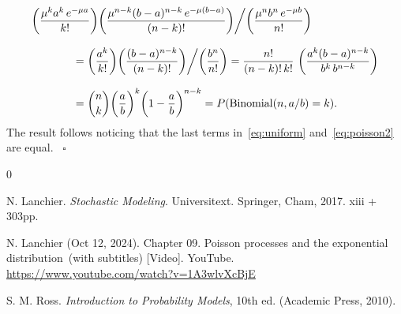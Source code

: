 \documentclass[letterpaper,11pt,twoside,keywordsasfootnote,addressatend,noinfoline]{article}
\renewenvironment{proof}{\noindent{\bf Proof.}}{\hspace*{2mm}~$\square$}
\DeclareMathOperator{\poisson}{Poisson}
\DeclareMathOperator{\binomial}{Binomial}
\begin{document}
\begin{proof}
\begin{equation}
\label{eq:poisson2}
\begin{array}{l}
\displaystyle \bigg(\frac{\mu^k a^k \,e^{- \mu a}}{k!} \bigg) \bigg(\frac{\mu^{n - k} (b - a)^{n - k} \,e^{- \mu (b - a)}}{(n - k)!} \bigg) \bigg/ \bigg(\frac{\mu^n b^n \,e^{- \mu b}}{n!} \bigg) \vspace*{12pt} \\ \hspace*{40pt} =
\displaystyle \bigg(\frac{a^k}{k!} \bigg) \bigg(\frac{(b - a)^{n - k}}{(n - k)!} \bigg) \bigg/ \bigg(\frac{b^n}{n!} \bigg) =
\displaystyle \frac{n!}{(n - k)! \,k!} \ \bigg(\frac{a^k (b - a)^{n - k}}{b^k \,b^{n - k}} \bigg) \vspace*{12pt} \\ \hspace*{40pt} =
\displaystyle {n \choose k} \bigg(\frac{a}{b} \bigg)^k \bigg(1 - \frac{a}{b} \bigg)^{n - k} =
\displaystyle P (\binomial (n, a/b) = k). \end{array}
\end{equation}
 The result follows noticing that the last terms in~\eqref{eq:uniform} and~\eqref{eq:poisson2} are equal.
\end{proof}


\begin{thebibliography}{0}

 N. Lanchier. \emph{Stochastic Modeling}. Universitext. Springer, Cham, 2017. xiii + 303pp.

 N. Lanchier (Oct 12, 2024).
 Chapter 09. Poisson processes and the exponential distribution~(with subtitles) [Video]. YouTube. \href{https://www.youtube.com/watch?v=1A3wlvXcBjE}{https://www.youtube.com/watch?v=1A3wlvXcBjE}

 S. M. Ross. \emph{Introduction to Probability Models}, 10th ed. (Academic Press, 2010).

\end{thebibliography}
\end{document}
